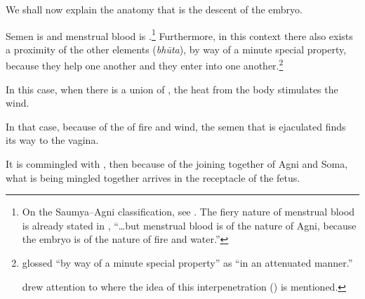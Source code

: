 \begin{translation}


\item[1] 

We shall now explain the anatomy that is the descent of the embryo. 


\item[3]

Semen is  and menstrual blood is
.\footnote{On the Saumya--Agni
    classification, see \cites{wuja-2004}{ange-2021}[521--527]{das-2003}. 
    The fiery nature of menstrual blood is already stated in
    , “\ldots but menstrual blood is of the nature of
    Agni, because the embryo is of the nature of fire and water.”} 
Furthermore, in this context there also exists a proximity of the
other elements (\emph{bhūta}), by way of a minute
special property,
because they help one another and they enter into one
another.\footnote{ glossed 
    “by way of a minute special property” as  “in an
    attenuated manner.”
        
         drew attention
        to  where the idea of this interpenetration
        () is mentioned.}


\item [4]

In this case,
when there is a union of ,
the heat from the body stimulates the wind.

In that case, 
because of the  of fire and wind,
the semen that is ejaculated finds its way to the vagina. 

It is commingled with , then because
of the joining together of Agni and Soma, what is being mingled together
arrives in the receptacle of the fetus. 


\end{translation}
